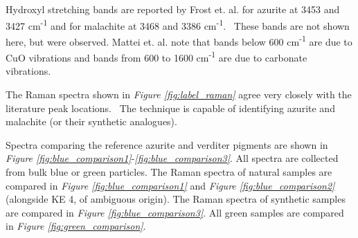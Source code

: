 Hydroxyl stretching bands are reported by Frost et. al. for azurite at 3453 and 3427 cm\textsuperscript{-1} and for malachite at 3468 and 3386 cm\textsuperscript{-1}.~\autocite{Frost} These bands are not shown here, but were observed. Mattei et. al. note that bands below 600 cm\textsuperscript{-1} are due to CuO vibrations and bands from 600 to 1600 cm\textsuperscript{-1} are due to carbonate vibrations.~\autocite{Mattei}

The Raman spectra shown in \textit{Figure \ref{fig:label_raman}} agree very closely with the literature peak locations.~\autocite{Mattei,Frost,Bicchieri} The technique is capable of identifying azurite and malachite (or their synthetic analogues).

Spectra comparing the reference azurite and verditer pigments are shown in \textit{Figure \ref{fig:blue_comparison1}}-\textit{\ref{fig:blue_comparison3}}. All spectra are collected from bulk blue or green particles. The Raman spectra of natural samples are compared in \textit{Figure \ref{fig:blue_comparison1}} and \textit{Figure \ref{fig:blue_comparison2}} (alongside KE 4, of ambiguous origin). The Raman spectra of synthetic samples are compared in \textit{Figure \ref{fig:blue_comparison3}}. All green samples are compared in \textit{Figure \ref{fig:green_comparison}}.

